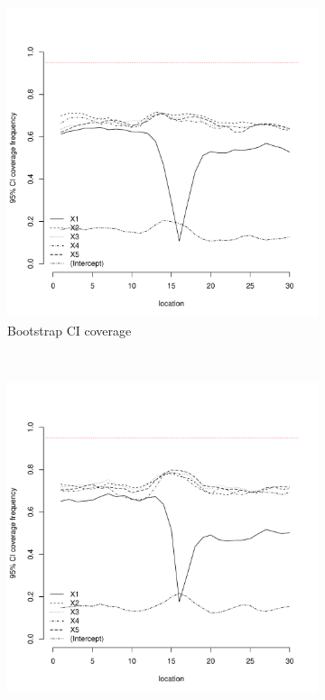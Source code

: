 \documentclass[authoryear, review, 11pt]{elsarticle}
\begin{document}
\begin{figure}
	\vspace{-30mm}
	\centering
	\begin{subfigure}[b]{0.45\textwidth}
	\centering
		\includegraphics[width=\textwidth]{../../figures/simulation/15.11.profile_bootstrap_coverage.pdf}
		\caption{Bootstrap CI coverage}
	\end{subfigure}%
	~ %
	\begin{subfigure}[b]{0.45\textwidth}
	\centering
		\includegraphics[width=\textwidth]{../../figures/simulation/15.11.profile_se_coverage.pdf}

\end{subfigure}
\end{figure}
\end{document}
